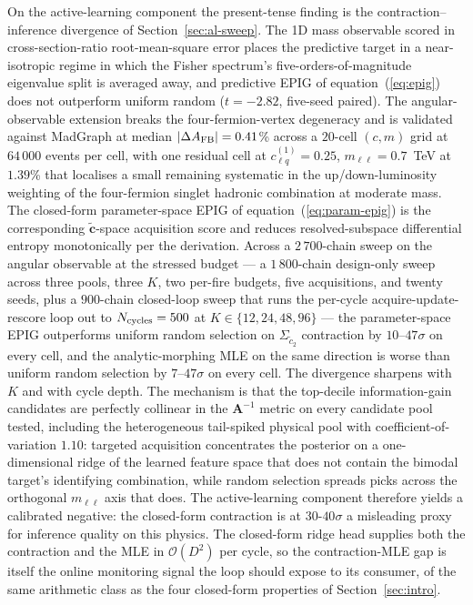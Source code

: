 \documentclass[11pt,a4paper]{article}
\newcommand{\mll}{m_{\ell\ell}}
\begin{document}
On the active-learning component the present-tense finding is the contraction--inference divergence of Section~\ref{sec:al-sweep}. The 1D mass observable scored in cross-section-ratio root-mean-square error places the predictive target in a near-isotropic regime in which the Fisher spectrum's five-orders-of-magnitude eigenvalue split is averaged away, and predictive EPIG of equation~(\ref{eq:epig}) does not outperform uniform random ($t = -2.82$, five-seed paired). The angular-observable extension breaks the four-fermion-vertex degeneracy and is validated against MadGraph at median $|\Delta A_{\rm FB}| = 0.41$\% across a $20$-cell $(c, m)$ grid at $64\,000$ events per cell, with one residual cell at $c_{\ell q}^{(1)} = 0.25$, $\mll = 0.7$~TeV at $1.39$\% that localises a small remaining systematic in the up/down-luminosity weighting of the four-fermion singlet hadronic combination at moderate mass. The closed-form parameter-space EPIG of equation~(\ref{eq:param-epig}) is the corresponding $\tilde{\bm{c}}$-space acquisition score and reduces resolved-subspace differential entropy monotonically per the derivation. Across a $2\,700$-chain sweep on the angular observable at the stressed budget — a $1\,800$-chain design-only sweep across three pools, three $K$, two per-fire budgets, five acquisitions, and twenty seeds, plus a $900$-chain closed-loop sweep that runs the per-cycle acquire-update-rescore loop out to $N_{\rm cycles} = 500$ at $K \in \{12, 24, 48, 96\}$ — the parameter-space EPIG outperforms uniform random selection on $\Sigma_{\tilde c_2}$ contraction by $10$--$47\sigma$ on every cell, and the analytic-morphing MLE on the same direction is worse than uniform random selection by $7$--$47\sigma$ on every cell. The divergence sharpens with $K$ and with cycle depth. The mechanism is that the top-decile information-gain candidates are perfectly collinear in the $\bm{A}^{-1}$ metric on every candidate pool tested, including the heterogeneous tail-spiked physical pool with coefficient-of-variation $1.10$: targeted acquisition concentrates the posterior on a one-dimensional ridge of the learned feature space that does not contain the bimodal target's identifying combination, while random selection spreads picks across the orthogonal $\mll$ axis that does. The active-learning component therefore yields a calibrated negative: the closed-form contraction is at $30$-$40\sigma$ a misleading proxy for inference quality on this physics. The closed-form ridge head supplies both the contraction and the MLE in $\mathcal{O}(D^2)$ per cycle, so the contraction-MLE gap is itself the online monitoring signal the loop should expose to its consumer, of the same arithmetic class as the four closed-form properties of Section~\ref{sec:intro}.
\end{document}
